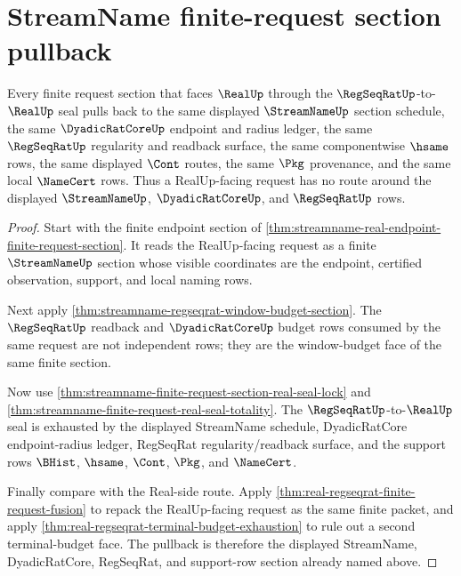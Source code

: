 \section{StreamName finite-request section pullback}
\label{sec:streamname-finite-request-section-pullback}

\begin{theorem}
\label{thm:streamname-finite-request-section-pullback}
Every finite request section that faces $\RealUp$ through the
$\RegSeqRatUp$-to-$\RealUp$ seal pulls back to the same displayed
$\StreamNameUp$ section schedule, the same $\DyadicRatCoreUp$ endpoint and
radius ledger, the same $\RegSeqRatUp$ regularity and readback surface, the
same componentwise $\hsame$ rows, the same displayed $\Cont$ routes, the same
$\Pkg$ provenance, and the same local $\NameCert$ rows. Thus a RealUp-facing
request has no route around the displayed $\StreamNameUp$,
$\DyadicRatCoreUp$, and $\RegSeqRatUp$ rows.
\end{theorem}
\begin{proof}
Start with the finite endpoint section of
\autoref{thm:streamname-real-endpoint-finite-request-section}. It reads the
RealUp-facing request as a finite $\StreamNameUp$ section whose visible
coordinates are the endpoint, certified observation, support, and local naming
rows.

Next apply \autoref{thm:streamname-regseqrat-window-budget-section}. The
$\RegSeqRatUp$ readback and $\DyadicRatCoreUp$ budget rows consumed by the same
request are not independent rows; they are the window-budget face of the same
finite section.

Now use
\autoref{thm:streamname-finite-request-section-real-seal-lock} and
\autoref{thm:streamname-finite-request-real-seal-totality}. The
$\RegSeqRatUp$-to-$\RealUp$ seal is exhausted by the displayed StreamName
schedule, DyadicRatCore endpoint-radius ledger, RegSeqRat regularity/readback
surface, and the support rows $\BHist$, $\hsame$, $\Cont$, $\Pkg$, and
$\NameCert$.

Finally compare with the Real-side route. Apply
\autoref{thm:real-regseqrat-finite-request-fusion} to repack the RealUp-facing
request as the same finite packet, and apply
\autoref{thm:real-regseqrat-terminal-budget-exhaustion} to rule out a second
terminal-budget face. The pullback is therefore the displayed StreamName,
DyadicRatCore, RegSeqRat, and support-row section already named above.
\end{proof}

